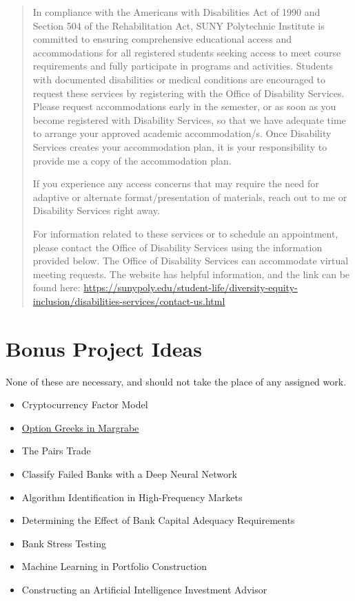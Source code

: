 \documentclass[11pt]{article}
\begin{document}
\begin{quote}
In compliance with the Americans with Disabilities Act of 1990 and Section 504 of the Rehabilitation Act, SUNY Polytechnic Institute is committed to ensuring comprehensive educational access and accommodations for all registered students seeking access to meet course requirements and fully participate in programs and activities.  Students with documented disabilities or medical conditions are encouraged to request these services by registering with the Office of Disability Services. Please request accommodations early in the semester, or as soon as you become registered with Disability Services, so that we have adequate time to arrange your approved academic accommodation/s.  Once Disability Services creates your accommodation plan, it is your responsibility to provide me a copy of the accommodation plan.

If you experience any access concerns that may require the need for adaptive or alternate format/presentation of materials, reach out to me or Disability Services right away. 

For information related to these services or to schedule an appointment, please contact the Office of Disability Services using the information provided below.  The Office of Disability Services can accommodate virtual meeting requests.  The website has helpful information, and the link can be found here: \url{https://sunypoly.edu/student-life/diversity-equity-inclusion/disabilities-services/contact-us.html}
\end{quote}
\section{Bonus Project Ideas}
\label{sec:org7f797c0}

None of these are necessary, and should not take the place of any assigned work.

\begin{itemize}
\item Cryptocurrency Factor Model
\item \href{https://colab.research.google.com/drive/1OtpEsx3RyoishcmKX4Q0a\_DZ2XHM3rje?usp=sharing}{Option Greeks in Margrabe}
\item The Pairs Trade
\item Classify Failed Banks with a Deep Neural Network
\item Algorithm Identification in High-Frequency Markets
\item Determining the Effect of Bank Capital Adequacy Requirements
\item Bank Stress Testing
\item Machine Learning in Portfolio Construction
\item Constructing an Artificial Intelligence Investment Advisor
\end{itemize}
\end{document}
